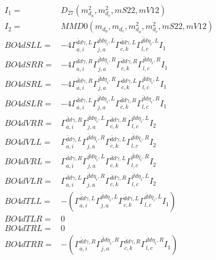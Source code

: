 \documentclass[A4,landscape]{article}
\begin{document}
\begin{align} 
I_1 = & D_{27}(m^2_{d_{{a}}}, m^2_{d_{{c}}}, mS22, mV12) \\ 
I_2 = & MMD0(m_{d_{{a}}}, m_{d_{{c}}}, m^2_{d_{{a}}}, m^2_{d_{{c}}}, mS22, mV12) \\ 
  BO4dSLL= & -4  \Gamma^{\bar{d}d \gamma ,L}_{a, i} \Gamma^{\bar{d}d \eta_i ,L}_{j, a} \Gamma^{\bar{d}d \gamma ,L}_{c, k} \Gamma^{\bar{d}d \eta_i ,L}_{l, c} I_1 \\ 
  BO4dSRR= & -4  \Gamma^{\bar{d}d \gamma ,R}_{a, i} \Gamma^{\bar{d}d \eta_i ,R}_{j, a} \Gamma^{\bar{d}d \gamma ,R}_{c, k} \Gamma^{\bar{d}d \eta_i ,R}_{l, c} I_1 \\ 
  BO4dSRL= & -4  \Gamma^{\bar{d}d \gamma ,R}_{a, i} \Gamma^{\bar{d}d \eta_i ,R}_{j, a} \Gamma^{\bar{d}d \gamma ,L}_{c, k} \Gamma^{\bar{d}d \eta_i ,L}_{l, c} I_1 \\ 
  BO4dSLR= & -4  \Gamma^{\bar{d}d \gamma ,L}_{a, i} \Gamma^{\bar{d}d \eta_i ,L}_{j, a} \Gamma^{\bar{d}d \gamma ,R}_{c, k} \Gamma^{\bar{d}d \eta_i ,R}_{l, c} I_1 \\ 
  BO4dVRR= &  \Gamma^{\bar{d}d \gamma ,R}_{a, i} \Gamma^{\bar{d}d \eta_i ,L}_{j, a} \Gamma^{\bar{d}d \gamma ,R}_{c, k} \Gamma^{\bar{d}d \eta_i ,L}_{l, c} I_2 \\ 
  BO4dVLL= &  \Gamma^{\bar{d}d \gamma ,L}_{a, i} \Gamma^{\bar{d}d \eta_i ,R}_{j, a} \Gamma^{\bar{d}d \gamma ,L}_{c, k} \Gamma^{\bar{d}d \eta_i ,R}_{l, c} I_2 \\ 
  BO4dVRL= &  \Gamma^{\bar{d}d \gamma ,R}_{a, i} \Gamma^{\bar{d}d \eta_i ,L}_{j, a} \Gamma^{\bar{d}d \gamma ,L}_{c, k} \Gamma^{\bar{d}d \eta_i ,R}_{l, c} I_2 \\ 
  BO4dVLR= &  \Gamma^{\bar{d}d \gamma ,L}_{a, i} \Gamma^{\bar{d}d \eta_i ,R}_{j, a} \Gamma^{\bar{d}d \gamma ,R}_{c, k} \Gamma^{\bar{d}d \eta_i ,L}_{l, c} I_2 \\ 
  BO4dTLL= & -( \Gamma^{\bar{d}d \gamma ,L}_{a, i} \Gamma^{\bar{d}d \eta_i ,L}_{j, a} \Gamma^{\bar{d}d \gamma ,L}_{c, k} \Gamma^{\bar{d}d \eta_i ,L}_{l, c} I_1) \\ 
  BO4dTLR= & 0 \\ 
  BO4dTRL= & 0 \\ 
  BO4dTRR= & -( \Gamma^{\bar{d}d \gamma ,R}_{a, i} \Gamma^{\bar{d}d \eta_i ,R}_{j, a} \Gamma^{\bar{d}d \gamma ,R}_{c, k} \Gamma^{\bar{d}d \eta_i ,R}_{l, c} I_1) \\ 
\end{align} 
\end{document}
